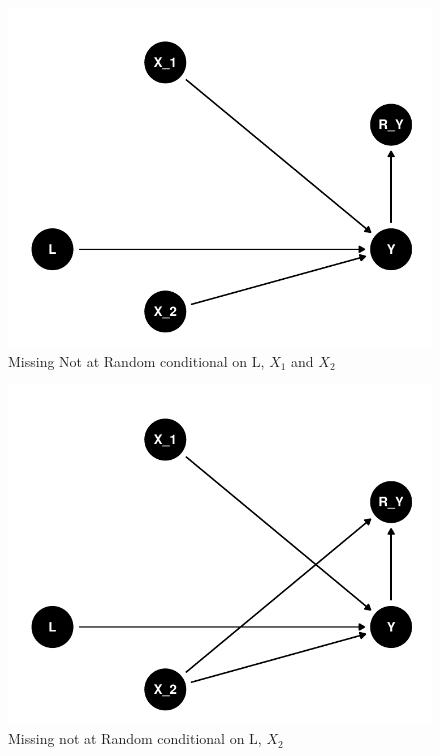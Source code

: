 \documentclass{article}
\begin{document}
\begin{figure}

{\centering \includegraphics{Final_Report_files/figure-latex/unnamed-chunk-4-1} 

}

\caption{Missing Not at Random conditional on L, \ensuremath{X_1} and \ensuremath{X_2}}\label{fig:unnamed-chunk-4}
\end{figure}

\begin{figure}

{\centering \includegraphics{Final_Report_files/figure-latex/unnamed-chunk-5-1} 

}

\caption{Missing not at Random conditional on L, \ensuremath{X_2}}\label{fig:unnamed-chunk-5}
\end{figure}
\end{document}

